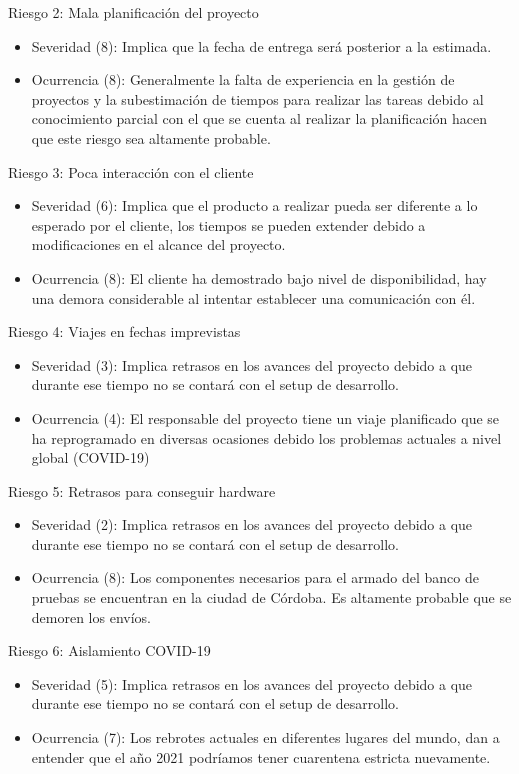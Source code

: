 \documentclass[11pt]{charter}
\begin{document}
Riesgo 2: Mala planificación del proyecto
\begin{itemize}
\item Severidad (8): Implica que la fecha de entrega será posterior a la estimada.
\item Ocurrencia (8): Generalmente la falta de experiencia en la gestión de proyectos y la subestimación de tiempos para realizar las tareas debido al conocimiento parcial con el que se cuenta al realizar la planificación hacen que este riesgo sea altamente probable.
\end{itemize}

Riesgo 3: Poca interacción con el cliente
\begin{itemize}
\item Severidad (6): Implica que el producto a realizar pueda ser diferente a lo esperado por el cliente, los tiempos se pueden extender debido a modificaciones en el alcance del proyecto. 
\item Ocurrencia (8): El cliente ha demostrado bajo nivel de disponibilidad, hay una demora considerable al intentar establecer una comunicación con él. 
\end{itemize}

Riesgo 4: Viajes en fechas imprevistas
\begin{itemize}
\item Severidad (3): Implica retrasos en los avances del proyecto debido a que durante ese tiempo no se contará con el setup de desarrollo.
\item Ocurrencia (4): El responsable del proyecto tiene un viaje planificado que se ha reprogramado en diversas ocasiones debido los problemas actuales a nivel global (COVID-19)
\end{itemize}

Riesgo 5: Retrasos para conseguir hardware
\begin{itemize}
\item Severidad (2): Implica retrasos en los avances del proyecto debido a que durante ese tiempo no se contará con el setup de desarrollo.
\item Ocurrencia (8): Los componentes necesarios para el armado del banco de pruebas se encuentran en la ciudad de Córdoba. Es altamente probable que se demoren los envíos.
\end{itemize}

Riesgo 6: Aislamiento COVID-19
\begin{itemize}
\item Severidad (5): Implica retrasos en los avances del proyecto debido a que durante ese tiempo no se contará con el setup de desarrollo.
\item Ocurrencia (7): Los rebrotes actuales en diferentes lugares del mundo, dan a entender que el año 2021 podríamos tener cuarentena estricta nuevamente.
\end{itemize}
\end{document}
